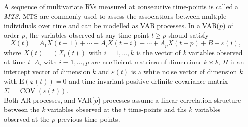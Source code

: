 A sequence of multivariate \acp{RV} measured at consecutive time-points is called a \textit{\ac{MTS}}. \ac{MTS} are commonly used to assess the associations between multiple individuals over time and can be modelled as \ac{VAR} processes. In a \ac{VAR}($p$) of order $p$, the variables observed at any time-point $t \geqslant p$ should satisfy
\begin{equation}
X(t)=A_{1} X(t-1)+\cdots+A_{i} X(t-i)+\cdots+A_{p} X(t-p)+B+\varepsilon(t),
\label{eq:multivariate_ts}
\end{equation}
where $X(t)=\left(X_{i}(t)\right)$ with $i=1,\ldots,k$ is the vector of $k$ variables observed at time $t$, $A_{i}$ with $i=1,\ldots,p$ are coefficient matrices of dimensions $k \times k$, $B$ is an intercept vector of dimension $k$ and $\varepsilon(t)$ is a white noise vector of dimension $k$ with $\mathrm{E}(\boldsymbol{\varepsilon}(t))=0$ and time-invariant positive definite covariance matrix $\Sigma = \operatorname{COV}(\varepsilon(t))$.\\
Both \ac{AR} processes, and \ac{VAR}($p$) processes assume a linear correlation structure between the $k$ variables observed at the $t$ time-points and the $k$ variables observed at the $p$ previous time-points.







